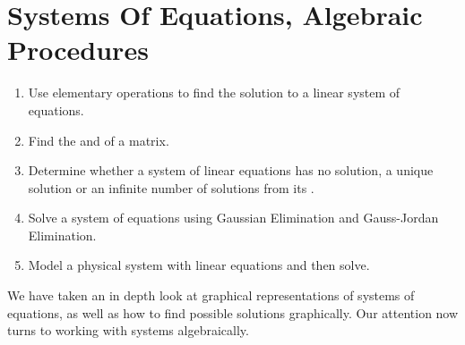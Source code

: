 \section{Systems Of Equations, Algebraic Procedures}

\begin{outcome}
\begin{enumerate}
\item[A.] Use elementary operations to find the solution to a linear system of equations. 

\item[B.] Find the \ef\;and \rref\;of a matrix. 

\item[C.] Determine whether a system of linear equations has no solution, a
unique solution or an infinite number of solutions from its \ef.

\item[D.] Solve a system of equations using Gaussian Elimination and Gauss-Jordan Elimination.

\item[E.] Model a physical system with linear equations and then solve. 
\end{enumerate}

\end{outcome}

We have taken an in depth look at graphical representations of systems of equations, as well as how to find possible
solutions graphically. Our attention now turns to working with systems algebraically. 

